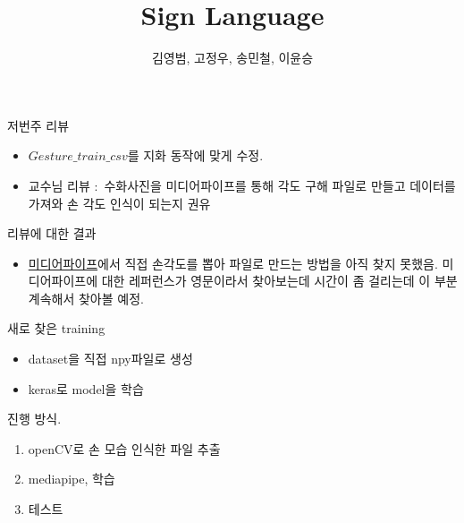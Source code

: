 \documentclass[10pt]{beamer}
\title{Sign Language}
\author{김영범, 고정우, 송민철, 이윤승}
\begin{document}
\begin{frame}
    \maketitle
\end{frame}


\begin{frame}{저번주 리뷰}
    \begin{itemize}
        \item $Gesture\_train\_csv$를 지화 동작에 맞게 수정.
        \item 교수님 리뷰 $:$  수화사진을 미디어파이프를 통해 각도 구해 파일로 만들고 데이터를 가져와 손 각도 인식이 되는지 권유
    \end{itemize}
\end{frame}

\begin{frame}{리뷰에 대한 결과}
    \begin{itemize}
        \item \href{https://mediapipe.dev/}{미디어파이프}에서 직접 손각도를 뽑아 파일로 만드는 방법을 아직 찾지 못했음. 미디어파이프에 대한 레퍼런스가 영문이라서 찾아보는데 시간이 좀 걸리는데 이 부분 계속해서 찾아볼 예정.
    \end{itemize}
\end{frame}

\begin{frame}{새로 찾은 training}
    \begin{itemize}
        \item dataset을 직접 npy파일로 생성
        \item keras로 model을 학습
    \end{itemize}
\end{frame}

\begin{frame}{진행 방식.}
    \begin{enumerate}
        \item openCV로 손 모습 인식한 파일 추출
        \item mediapipe, 학습
        \item 테스트
    \end{enumerate}
\end{frame}
\end{document}
